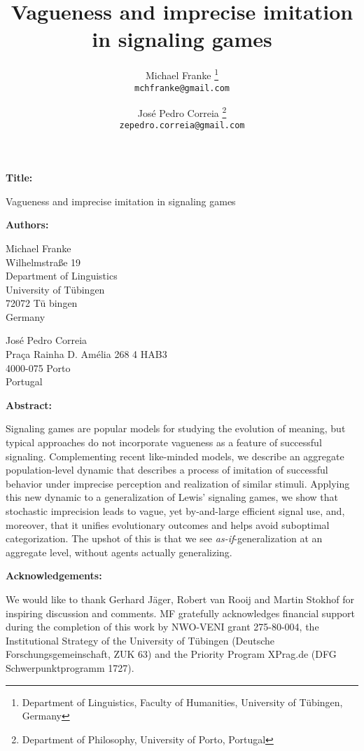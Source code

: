 \documentclass{article}
\title{Vagueness and imprecise imitation in signaling games}
\author{
Michael Franke%
\thanks{Department of Linguistics, Faculty of Humanities, University of Tübingen, Germany}\\
\texttt{mchfranke@gmail.com}
\and
Jos\'e Pedro Correia%
\thanks{Department of Philosophy, University of Porto, Portugal}\\
\texttt{zepedro.correia@gmail.com}
}
\date{}
\begin{document}
\noindent \textbf{Title:} 

\medskip

\noindent Vagueness and imprecise imitation in signaling games

\medskip
\medskip
\medskip

\noindent \textbf{Authors:}

\medskip

\begin{minipage}{0.4\linewidth}
  Michael Franke \\
  Wilhelmstra\ss e 19\\
  Department of Linguistics\\
  University of T\"ubingen\\
  72072 T\"u bingen \\
  Germany \\
\end{minipage}
\hfill
\begin{minipage}{0.5\linewidth}
  Jos\'e Pedro Correia\\
  Praça Rainha D. Amélia 268 4 HAB3\\
  4000-075 Porto\\
  Portugal \\
\end{minipage}

\medskip
\medskip
\medskip

\noindent \textbf{Abstract:}

\medskip 

\noindent  Signaling games are popular models for studying the evolution of meaning, but typical
  approaches do not incorporate vagueness as a feature of successful signaling.  Complementing
  recent like-minded models, we describe an aggregate population-level dynamic that describes a
  process of imitation of successful behavior under imprecise perception and realization of
  similar stimuli. Applying this new dynamic to a generalization of Lewis' signaling games, we
  show that stochastic imprecision leads to vague, yet by-and-large efficient signal use, and,
  moreover, that it unifies evolutionary outcomes and helps avoid suboptimal
  categorization. The upshot of this is that we see \emph{as-if}-generalization at an aggregate
  level, without agents actually generalizing.

\medskip
\medskip
\medskip

\noindent \textbf{Acknowledgements:}

\medskip 

\noindent We would like to thank Gerhard J\"ager, Robert van Rooij and Martin Stokhof for
inspiring discussion and comments. MF gratefully acknowledges financial support during the
completion of this work by NWO-VENI grant 275-80-004, the Institutional Strategy of the
University of T\"ubingen (Deutsche Forschungsgemeinschaft, ZUK 63) and the Priority Program
XPrag.de (DFG Schwerpunktprogramm 1727).
\end{document}
